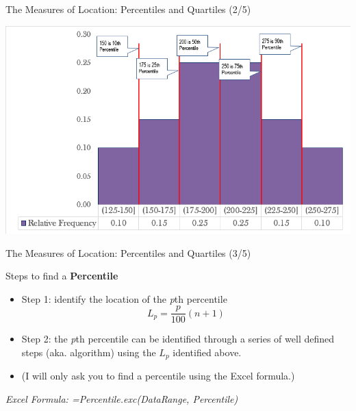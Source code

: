 \documentclass{beamer}
\begin{document}
\begin{frame}{The Measures of Location: Percentiles and Quartiles (2/5)}

\begin{center}
\includegraphics[scale=.5]{images/ch2Percentiles.png}

\end{center}

\end{frame}




\begin{frame}{The Measures of Location: Percentiles and Quartiles (3/5)}

Steps to find a \textbf{Percentile}
\begin{itemize}
\item Step 1: identify the location of the \textit{p}th percentile
$$L_p = \frac{p}{100} (n + 1) $$

\item Step 2: the \textit{p}th percentile can be identified through a series of well defined steps (aka. algorithm) using the $L_p$ identified above. 
\item (I will only ask you to find a percentile using the Excel formula.)
\end{itemize}
\begin{flushright}
\textit{Excel Formula: =Percentile.exc(DataRange, Percentile)
}
\end{flushright}

\end{frame}
\end{document}
